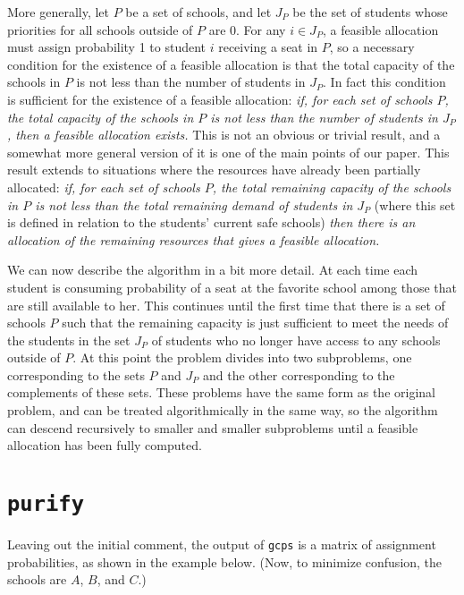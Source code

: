 \documentclass[12pt]{article}
\theoremstyle{definition}
\begin{document}
More generally, let $P$ be a set of schools, and let $J_P$ be the set
of students whose priorities for all schools outside of $P$ are 0.
For any $i \in J_P$, a feasible allocation must assign probability 1
to student $i$ receiving a seat in $P$, so a necessary condition for
the existence of a feasible allocation is that the total capacity of
the schools in $P$ is not less than the number of students in $J_P$.
In fact this condition is sufficient for the existence of a feasible
allocation: \emph{if, for each set of schools $P$, the total capacity
  of the schools in $P$ is not less than the number of students in
  $J_P$, then a feasible allocation exists.}  This is not an obvious
or trivial result, and a somewhat more general version of it is one of
the main points of our paper.  This result extends to situations where
the resources have already been partially allocated: \emph{if, for
  each set of schools $P$, the total remaining capacity of the schools
  in $P$ is not less than the total remaining demand of students in
  $J_P$} (where this set is defined in relation to the students'
current safe schools) \emph{then there is an allocation of the
  remaining resources that gives a feasible allocation.}

We can now describe the algorithm in a bit more detail.  At each time
each student is consuming probability of a seat at the favorite school
among those that are still available to her.  This continues until the
first time that there is a set of schools $P$ such that the remaining
capacity is just sufficient to meet the needs of the students in the
set $J_P$ of students who no longer have access to any schools outside
of $P$.  At this point the problem divides into two subproblems, one
corresponding to the sets $P$ and $J_P$ and the other corresponding to
the complements of these sets.  These problems have the same form as
the original problem, and can be treated algorithmically in the same
way, so the algorithm can descend recursively to smaller and smaller
subproblems until a feasible allocation has been fully computed.


\section{\texttt{purify}} \label{sec:Implementation}

Leaving out the initial comment, the output of \texttt{gcps} is a
matrix of assignment probabilities, as shown in the example below.
(Now, to minimize confusion, the schools are $A$, $B$, and $C$.)
\end{document}

